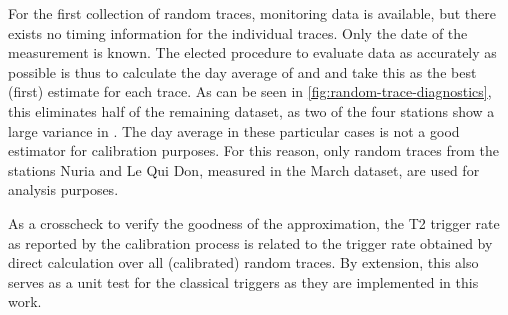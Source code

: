 For the first collection of random traces, monitoring data is available, but there exists no timing information for the individual traces. Only the date of the 
measurement is known. The elected procedure to evaluate data as accurately as possible is thus to calculate the day average of \Ipeak and \Qpeak and take this as 
the best (first) estimate for each trace. As can be seen in \autoref{fig:random-trace-diagnostics}, this eliminates half of the remaining dataset, as two of the four 
stations show a large variance in \Ipeak. The day average in these particular cases is not a good estimator for calibration purposes. For this reason, only random 
traces from the stations Nuria and Le Qui Don, measured in the March dataset, are used for analysis purposes.

As a crosscheck to verify the goodness of the approximation, the T2 trigger rate as reported by the calibration process is related to the trigger rate obtained by
direct calculation over all (calibrated) random traces. By extension, this also serves as a unit test for the classical triggers as they are implemented in this work. 


